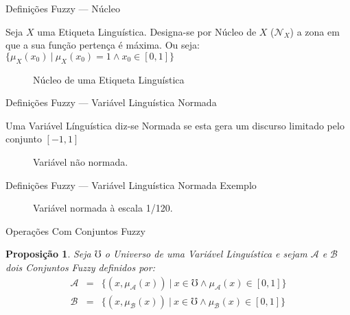 \documentclass[portuges]{beamer}
\newtheorem{proposition}[theorem]{Proposição}
\begin{document}
\begin{frame}{Definições Fuzzy --- Núcleo}
\begin{definition}
		Seja $X$ uma Etiqueta Linguística. Designa-se por Núcleo de $X$ ($\mathcal{N}_X$)
		a zona em que a sua função pertença é máxima. Ou seja: $\{\mu_X(x_0) \ \vert \ \mu_X(x_0) = 1 \land x_0 \in [0,1] \}$
	\end{definition}

	\begin{figure}
			\centering
			\caption{Núcleo de uma Etiqueta Linguística}
	\end{figure}
\end{frame}

\begin{frame}{Definições Fuzzy --- Variável Linguística Normada}  	
\begin{definition}
		Uma Variável Línguística diz-se Normada se esta gera um discurso limitado pelo 
		conjunto $[-1,1]$
	\end{definition}
		\begin{figure}
			\centering
			\caption{Variável não normada.}
	\end{figure}
\end{frame}

\begin{frame}{Definições Fuzzy --- Variável Linguística Normada Exemplo}  	
	\begin{example}		
	\begin{figure}
			\centering
			\caption{Variável normada à escala 1/120.}
	\end{figure}
	\end{example}
\end{frame}

\begin{frame}{Operações Com Conjuntos Fuzzy}
	\begin{proposition}
		Seja $\mho$ o Universo de uma Variável Linguística
		e sejam $\mathcal{A}$ e $\mathcal{B}$ dois Conjuntos Fuzzy 
		definidos por:
		$$
			\begin{array}{ccc}
				\mathcal{A} & = & \{ (x,\mu_\mathcal{A}(x))\ \vert\ x \in \mho \land \mu_\mathcal{A}(x) \in [0,1] \} \\
				\mathcal{B} & = & \{ (x,\mu_\mathcal{B}(x))\ \vert\ x \in \mho \land \mu_\mathcal{B}(x) \in [0,1] \}
			\end{array}
		$$   
	\end{proposition}
\end{frame}
\end{document}
